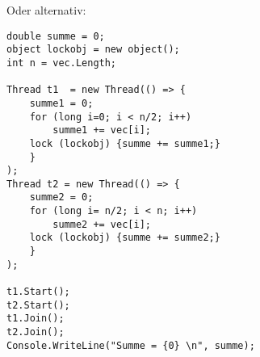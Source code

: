 Oder alternativ:
\begin{lstlisting}[language={[Sharp]C}]
double summe = 0;
object lockobj = new object();
int n = vec.Length;

Thread t1  = new Thread(() => {
	summe1 = 0;
	for (long i=0; i < n/2; i++)
		summe1 += vec[i];
	lock (lockobj) {summe += summe1;}
	}
);
Thread t2 = new Thread(() => {
	summe2 = 0;
	for (long i= n/2; i < n; i++)
		summe2 += vec[i];
	lock (lockobj) {summe += summe2;}
	}
);

t1.Start();
t2.Start();
t1.Join();
t2.Join();
Console.WriteLine("Summe = {0} \n", summe);
\end{lstlisting}